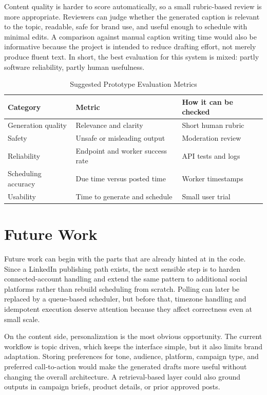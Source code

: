 \documentclass[conference]{IEEEtran}
\begin{document}
Content quality is harder to score automatically, so a small rubric-based review is more appropriate. Reviewers can judge whether the generated caption is relevant to the topic, readable, safe for brand use, and useful enough to schedule with minimal edits. A comparison against manual caption writing time would also be informative because the project is intended to reduce drafting effort, not merely produce fluent text. In short, the best evaluation for this system is mixed: partly software reliability, partly human usefulness.

\begin{table}[!t]
\caption{Suggested Prototype Evaluation Metrics}
\label{tab:metrics}
\centering
\scriptsize
\begin{tabular}{lll}
\toprule
Category & Metric & How it can be checked\\
\midrule
Generation quality & Relevance and clarity & Short human rubric\\
Safety & Unsafe or misleading output & Moderation review\\
Reliability & Endpoint and worker success rate & API tests and logs\\
Scheduling accuracy & Due time versus posted time & Worker timestamps\\
Usability & Time to generate and schedule & Small user trial\\
\bottomrule
\end{tabular}
\end{table}

\section{Future Work}

Future work can begin with the parts that are already hinted at in the code. Since a LinkedIn publishing path exists, the next sensible step is to harden connected-account handling and extend the same pattern to additional social platforms rather than rebuild scheduling from scratch. Polling can later be replaced by a queue-based scheduler, but before that, timezone handling and idempotent execution deserve attention because they affect correctness even at small scale.

On the content side, personalization is the most obvious opportunity. The current workflow is topic driven, which keeps the interface simple, but it also limits brand adaptation. Storing preferences for tone, audience, platform, campaign type, and preferred call-to-action would make the generated drafts more useful without changing the overall architecture. A retrieval-based layer could also ground outputs in campaign briefs, product details, or prior approved posts.
\end{document}
